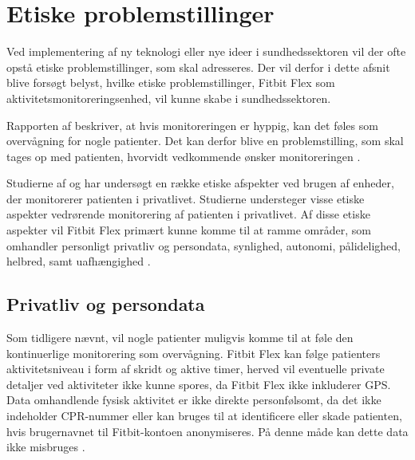 \section{Etiske problemstillinger}

Ved implementering af ny teknologi eller nye ideer i sundhedssektoren vil der ofte opstå etiske problemstillinger, som skal adresseres. Der vil derfor i dette afsnit blive forsøgt belyst, hvilke etiske problemstillinger, Fitbit Flex som aktivitetsmonitoreringsenhed, vil kunne skabe i sundhedssektoren.

Rapporten af \citeauthor{patienthome2015} beskriver, at hvis monitoreringen er hyppig, kan det føles som overvågning for nogle patienter. Det kan derfor blive en problemstilling, som skal tages op med patienten, hvorvidt vedkommende ønsker monitoreringen \citep{patienthome2015, SundhedsstyrelsenPatientersRetsstilling2016}.

Studierne af \citeauthor{Mittelstand2011} og \citeauthor{Nordgren2013} har undersøgt en række etiske afspekter ved brugen af enheder, der monitorerer patienten i privatlivet. Studierne understeger visse etiske aspekter vedrørende monitorering af patienten i privatlivet.%
Af disse etiske aspekter vil Fitbit Flex primært kunne komme til at ramme områder, som omhandler personligt privatliv og persondata, synlighed, autonomi, pålidelighed, helbred, samt uafhængighed \citep{Mittelstand2011, Nordgren2013}.


\subsection{Privatliv og persondata}

Som tidligere nævnt, vil nogle patienter muligvis komme til at føle den kontinuerlige monitorering som overvågning. Fitbit Flex kan følge patienters aktivitetsniveau i form af skridt og aktive timer, herved vil eventuelle private detaljer ved aktiviteter ikke kunne spores, da Fitbit Flex ikke inkluderer GPS.
Data omhandlende fysisk aktivitet er ikke direkte personfølsomt, da det ikke indeholder CPR-nummer eller kan bruges til at identificere eller skade patienten, hvis brugernavnet til Fitbit-kontoen anonymiseres. På denne måde kan dette data ikke misbruges \citep{Mittelstand2011}.


